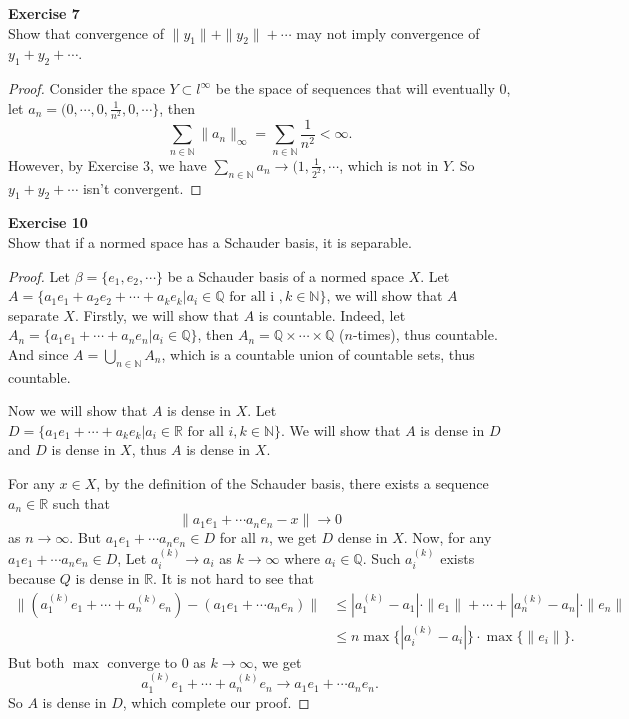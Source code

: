 \documentclass[12pt, a4paper]{article}
\theoremstyle{plain}
\newcommand{\N}{\mathbb{N}}
\newcommand{\Q}{\mathbb{Q}}
\newcommand{\R}{\mathbb{R}}
\newenvironment{exercise}[2][Exercise]
    { \begin{mdframed}[backgroundcolor=gray!20] \textbf{#1 #2} \\}
    {  \end{mdframed}}
\begin{document}
\begin{exercise}{7}
Show that convergence of $\|y_1\|+\|y_2\|+\cdots$ may not imply convergence of $y_1+y_2+\cdots$.
\end{exercise}
	\begin{proof}
	Consider the space $Y\subset l^\infty$ be the space of sequences that will eventually $0$, let $a_n=(0,\cdots,0,\frac{1}{n^2},0,\cdots\}$, then 
	\[
	\sum_{n\in\N}{\|a_n\|_\infty}=\sum_{n\in\N}{\frac{1}{n^2}}<\infty.
	\]
	However, by Exercise 3, we have $\sum_{n\in\N}{a_n}\rightarrow (1,\frac{1}{2^2},\cdots$, which is not in $Y$. So $y_1+y_2+\cdots$ isn't convergent.
	\end{proof}

\pagebreak

\begin{exercise}{10}
Show that if a normed space has a Schauder basis, it is separable.
\end{exercise}
	\begin{proof}
	Let $\beta = \{e_1,e_2,\cdots\}$ be a Schauder basis of a normed space $X$. Let $A=\{a_1e_1+a_2e_2+\cdots +a_ke_k| a_i\in \Q \text{ for all i },k\in \N\}$, we will show that $A$ separate $X$. Firstly, we will show that $A$ is countable. Indeed, let $A_n=\{a_1e_1+\cdots +a_ne_n|a_i\in \Q\}$, then $A_n=\Q\times\cdots\times \Q$ ($n$-times), thus countable. And since $A = \bigcup_{n\in\N}A_n$, which is a countable union of countable sets, thus countable.
	
	Now we will show that $A$ is dense in $X$. Let $D = \{a_1e_1+\cdots +a_ke_k|a_i\in \R \text{ for all }i, k\in \N\}$. We will show that $A$ is dense in $D$ and $D$ is dense in $X$, thus $A$ is dense in $X$.
	
	For any $x\in X$, by the definition of the Schauder basis, there exists a sequence $a_n\in \R$ such that 
	\[
	\|a_1e_1+\cdots a_ne_n-x\|\rightarrow 0
	\]
	as $n\rightarrow \infty$. But $a_1e_1+\cdots a_ne_n\in D$ for all $n$, we get $D$ dense in $X$. Now, for any $a_1e_1+\cdots a_ne_n \in D$, Let $a_i^(k)\rightarrow a_i$ as $k\rightarrow\infty$ where $a_i\in \Q$. Such $a_i^{(k)}$ exists because $Q$ is dense in $\R$. It is not hard to see that
	\begin{align*}
	\|(a_1^{(k)}e_1+\cdots+a_n^{(k)}e_n)-(a_1e_1+\cdots a_ne_n)\|&\leq |a_1^{(k)}-a_1|\cdot \|e_1\|+\cdots+|a_n^{(k)}-a_n|\cdot \|e_n\|\\
	&\leq n\max\{|a_i^{(k)}-a_i|\}\cdot \max\{\|e_i\|\}.
	\end{align*}
	But both $\max$ converge to $0$ as $k\rightarrow \infty$, we get 
	\[
	a_1^{(k)}e_1+\cdots+a_n^{(k)}e_n\rightarrow a_1e_1+\cdots a_ne_n.
	\]
	So $A$ is dense in $D$, which complete our proof.
	\end{proof}
\end{document}
